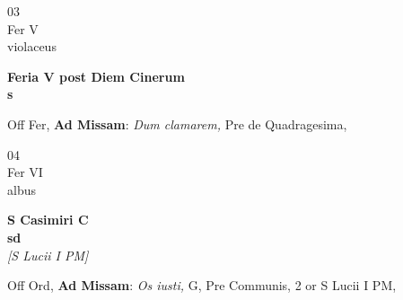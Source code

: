 \documentclass[10pt, openany]{book}
\begin{document}
        \begin{center}
            \begin{minipage}{3.5in}
                \vspace{2em}
                \begin{minipage}{0.5in}
                    {\Huge 03} \\
                    {\normalsize Fer V} \\
                    {\normalsize violaceus}
                \end{minipage}
                \begin{minipage}{3.0in}
                    \textbf{ \large Feria V post Diem Cinerum \\
                    \textnormal{\normalsize s}} \\ 
                \end{minipage}
                \begin{justify}Off Fer, \textbf{Ad Missam}: \textit{Dum clamarem,} Pre de Quadragesima,  
                \end{justify}
            \end{minipage}
        \end{center}
    
        \begin{center}
            \begin{minipage}{3.5in}
                \vspace{2em}
                \begin{minipage}{0.5in}
                    {\Huge 04} \\
                    {\normalsize Fer VI} \\
                    {\normalsize albus}
                \end{minipage}
                \begin{minipage}{3.0in}
                    \textbf{ \large S Casimiri C \\
                    \textnormal{\normalsize sd}} \\ \textit{[S Lucii I PM]} \\ 
                \end{minipage}
                \begin{justify}Off Ord, \textbf{Ad Missam}: \textit{Os iusti,} G, Pre Communis, 2 or S Lucii I PM,  
                \end{justify}
            \end{minipage}
        \end{center}
    
\end{document}
